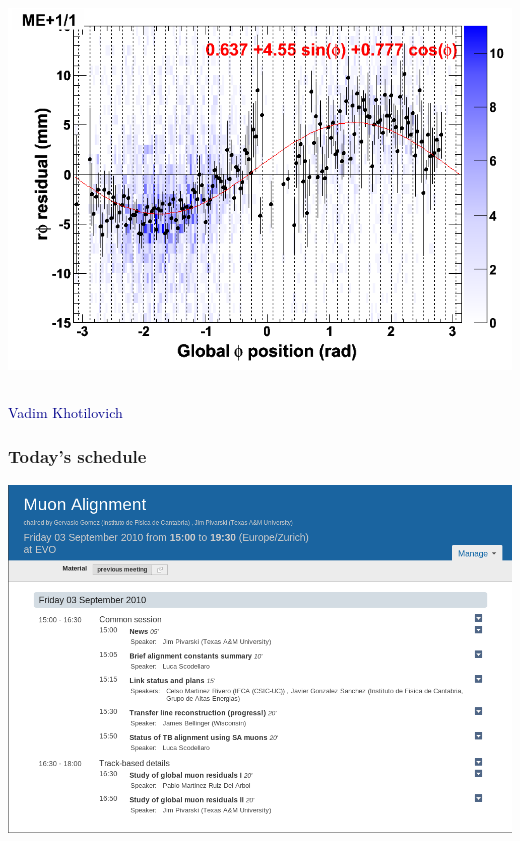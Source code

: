 \documentclass[compress]{beamer}
\begin{document}
\begin{frame}
\begin{columns}
\vspace{-0.25 cm}
\includegraphics[width=\linewidth]{endcap_allmomenta.png}
\end{columns}

\hfill \textcolor{darkblue}{Vadim Khotilovich}
\end{frame}

\begin{frame}
\frametitle{Today's schedule}

\includegraphics[width=\linewidth]{schedule.png}
\label{numpages}
\end{frame}
\end{document}

